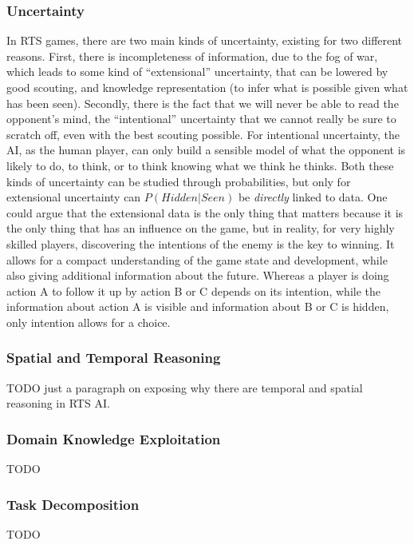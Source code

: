 \documentclass[journal]{IEEEtran}
\begin{document}
{\subsubsection{Uncertainty}
In RTS games, there are two main kinds of uncertainty, existing for two different reasons. First, there is incompleteness of information, due to the fog of war, which leads to some kind of ``extensional'' 
uncertainty, that can be lowered by good scouting, and knowledge representation (to infer what is possible given what has been seen). Secondly, there is the fact that we will never be able to read the opponent's mind, the ``intentional'' 
uncertainty that we cannot really be sure to scratch off, even with the best scouting possible. For intentional uncertainty, the AI, as the human player, can only build a sensible model of what the opponent is likely to do, to think, or to think knowing what we think he thinks. Both these kinds of uncertainty can be studied through probabilities, but only for extensional uncertainty can $P(Hidden | Seen)$ be \textit{directly} linked to data. %
One could argue that the extensional data is the only thing that matters because it is the only thing that has an influence on the game, but in reality, for very highly skilled players, discovering the intentions of the enemy is the key to winning. It allows for a compact understanding of the game state and development, while also giving additional information about the future. Whereas a player is doing action A to follow it up by action B or C depends on its intention, while the information about action A is visible and information about B or C is hidden, only intention allows for a choice.

\subsubsection{Spatial and Temporal Reasoning}
TODO just a paragraph on exposing why there are temporal and spatial reasoning in RTS AI.

\subsubsection{Domain Knowledge Exploitation}
TODO

\subsubsection{Task Decomposition}
TODO
}
\end{document}
